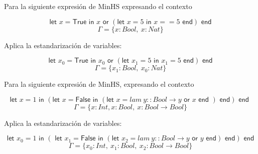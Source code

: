 \begin{exercise}    
    Para la siguiente expresión de \textsf{MinHS} expresando el contexto

    $$ \textsf{let } x = \textsf{True} \textsf{ in } x \textsf{ or } (\textsf{let } x = 5 \textsf{ in } x == 5 \textsf{ end}) \textsf{ end} $$
    $$ \Gamma = \{x:Bool,\ x:Nat\}$$
    
    Aplica la estandarización de variables: 
    
    $$ \textsf{let } x_0 = \textsf{True} \textsf{ in } x_0 \textsf{ or } (\textsf{let } x_1 = 5 \textsf{ in } x_1 = 5 \textsf{ end}) \textsf{ end} $$
    $$ \Gamma = \{x_1:Bool,\ x_0:Nat\}$$
\end{exercise}

\begin{exercise}    
    Para la siguiente expresión de \textsf{MinHS}, expresando el contexto
    
    $$ \textsf{let } x = 1 \textsf{ in } (\textsf{let } x = \textsf{False} \textsf{ in } (\textsf{let } x = lam\ y :: Bool \to y  \textsf{ or } x \textsf{ end }) \textsf{ end}) \textsf{ end }$$
    $$ \Gamma = \{ x : Int, x : Bool,\ x : Bool \to Bool \}$$
    
    Aplica la estandarización de variables:
    
    $$ \textsf{let } x_0 = 1 \textsf{ in } (\textsf{ let } x_1 = \textsf{False} \textsf{ in } (\textsf{let } x_2 = lam\ y :: Bool \to y  \textsf{ or } y \textsf{ end}) \textsf{ end}) \textsf{ end} $$
    $$ \Gamma = \{ x_0 : Int,\ x_1 : Bool,\ x_2 : Bool \to Bool \}$$
\end{exercise}

